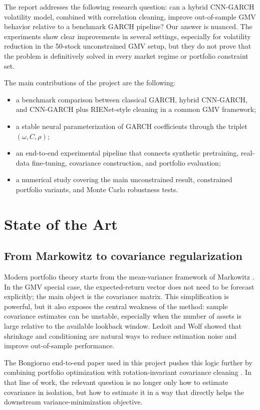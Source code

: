 \documentclass[11pt,a4paper]{article}
\begin{document}
The report addresses the following research question: can a hybrid CNN-GARCH volatility model, combined with correlation cleaning, improve out-of-sample GMV behavior relative to a benchmark GARCH pipeline? Our answer is nuanced. The experiments show clear improvements in several settings, especially for volatility reduction in the 50-stock unconstrained GMV setup, but they do not prove that the problem is definitively solved in every market regime or portfolio constraint set.

The main contributions of the project are the following:
\begin{itemize}[leftmargin=1.5em]
\item a benchmark comparison between classical GARCH, hybrid CNN-GARCH, and CNN-GARCH plus RIENet-style cleaning in a common GMV framework;
\item a stable neural parameterization of GARCH coefficients through the triplet $(\omega, C, \rho)$;
\item an end-to-end experimental pipeline that connects synthetic pretraining, real-data fine-tuning, covariance construction, and portfolio evaluation;
\item a numerical study covering the main unconstrained result, constrained portfolio variants, and Monte Carlo robustness tests.
\end{itemize}

\section{State of the Art}

\subsection{From Markowitz to covariance regularization}

Modern portfolio theory starts from the mean-variance framework of Markowitz \cite{markowitz1952}. In the GMV special case, the expected-return vector does not need to be forecast explicitly; the main object is the covariance matrix. This simplification is powerful, but it also exposes the central weakness of the method: sample covariance estimates can be unstable, especially when the number of assets is large relative to the available lookback window. Ledoit and Wolf \cite{ledoit2004} showed that shrinkage and conditioning are natural ways to reduce estimation noise and improve out-of-sample performance.

The Bongiorno end-to-end paper used in this project pushes this logic further by combining portfolio optimization with rotation-invariant covariance cleaning \cite{bongiorno2025e2e}. In that line of work, the relevant question is no longer only how to estimate covariance in isolation, but how to estimate it in a way that directly helps the downstream variance-minimization objective.
\end{document}
